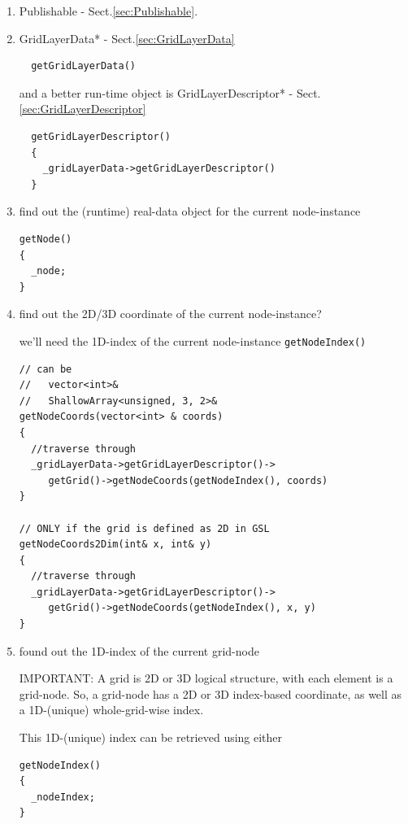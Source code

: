 \begin{enumerate}
  \item Publishable - Sect.\ref{sec:Publishable}.

  \item GridLayerData* - Sect.\ref{sec:GridLayerData}
  \begin{verbatim}
  getGridLayerData()
  \end{verbatim}
  
  and a better run-time object is GridLayerDescriptor* - Sect.\ref{sec:GridLayerDescriptor}
  \begin{verbatim}
  getGridLayerDescriptor()
  {
    _gridLayerData->getGridLayerDescriptor()
  }
  \end{verbatim}
  
  \item find out the (runtime) real-data object for the current node-instance
  
\begin{verbatim}
getNode()
{
  _node;
}
\end{verbatim}
  
  \item find out the 2D/3D coordinate of the current node-instance?
  
we'll need the 1D-index of the current node-instance \verb!getNodeIndex()!
\begin{verbatim}
// can be 
//   vector<int>&
//   ShallowArray<unsigned, 3, 2>&
getNodeCoords(vector<int> & coords)
{
  //traverse through
  _gridLayerData->getGridLayerDescriptor()->
     getGrid()->getNodeCoords(getNodeIndex(), coords)
}

// ONLY if the grid is defined as 2D in GSL
getNodeCoords2Dim(int& x, int& y)
{
  //traverse through
  _gridLayerData->getGridLayerDescriptor()->
     getGrid()->getNodeCoords(getNodeIndex(), x, y)  
}

\end{verbatim}
  
  \item found out the 1D-index of the current grid-node
  
IMPORTANT: A grid is 2D or 3D logical structure, with each element is a grid-node. So, a grid-node has a 2D or 3D index-based coordinate, 
as well as a 1D-(unique) whole-grid-wise index. 

This 1D-(unique) index can be retrieved using either 
  
\begin{verbatim}
getNodeIndex()
{
  _nodeIndex;
}
\end{verbatim}  


\end{enumerate}
